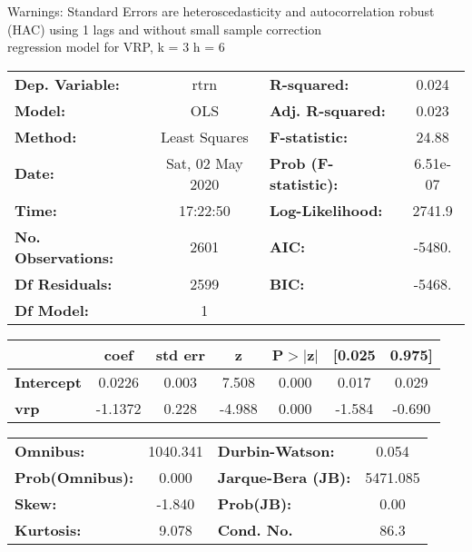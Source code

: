 Warnings: \newline
 [1] Standard Errors are heteroscedasticity and autocorrelation robust (HAC) using 1 lags and without small sample correction\\ 

regression model for VRP, k = 3 h = 6\begin{center}
\begin{tabular}{lclc}
\toprule
\textbf{Dep. Variable:}    &       rtrn       & \textbf{  R-squared:         } &     0.024   \\
\textbf{Model:}            &       OLS        & \textbf{  Adj. R-squared:    } &     0.023   \\
\textbf{Method:}           &  Least Squares   & \textbf{  F-statistic:       } &     24.88   \\
\textbf{Date:}             & Sat, 02 May 2020 & \textbf{  Prob (F-statistic):} &  6.51e-07   \\
\textbf{Time:}             &     17:22:50     & \textbf{  Log-Likelihood:    } &    2741.9   \\
\textbf{No. Observations:} &        2601      & \textbf{  AIC:               } &    -5480.   \\
\textbf{Df Residuals:}     &        2599      & \textbf{  BIC:               } &    -5468.   \\
\textbf{Df Model:}         &           1      & \textbf{                     } &             \\
\bottomrule
\end{tabular}
\begin{tabular}{lcccccc}
                   & \textbf{coef} & \textbf{std err} & \textbf{z} & \textbf{P$> |$z$|$} & \textbf{[0.025} & \textbf{0.975]}  \\
\midrule
\textbf{Intercept} &       0.0226  &        0.003     &     7.508  &         0.000        &        0.017    &        0.029     \\
\textbf{vrp}       &      -1.1372  &        0.228     &    -4.988  &         0.000        &       -1.584    &       -0.690     \\
\bottomrule
\end{tabular}
\begin{tabular}{lclc}
\textbf{Omnibus:}       & 1040.341 & \textbf{  Durbin-Watson:     } &    0.054  \\
\textbf{Prob(Omnibus):} &   0.000  & \textbf{  Jarque-Bera (JB):  } & 5471.085  \\
\textbf{Skew:}          &  -1.840  & \textbf{  Prob(JB):          } &     0.00  \\
\textbf{Kurtosis:}      &   9.078  & \textbf{  Cond. No.          } &     86.3  \\
\bottomrule
\end{tabular}
\end{center}

